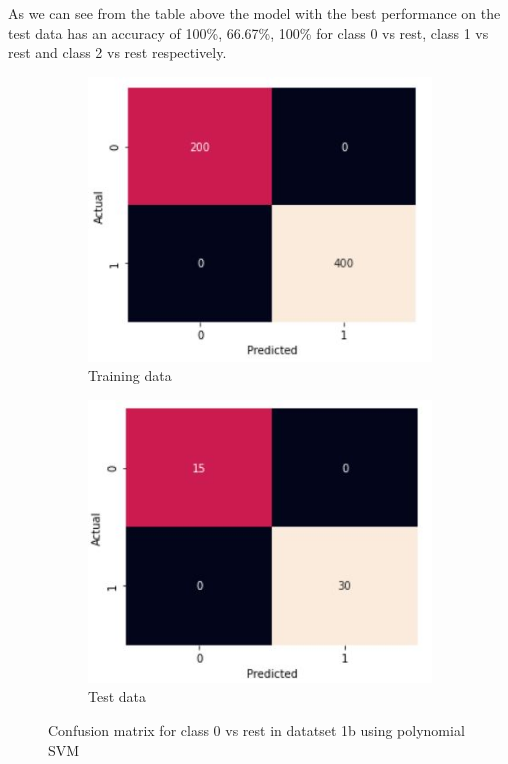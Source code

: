 \documentclass[11pt]{article}
\begin{document}
As we can see from the table above the model with the best performance on the test data has an accuracy of 100\%, 66.67\%, 100\% for class 0 vs rest, class 1 vs rest and class 2 vs rest respectively. 

\begin{figure}[h]
\centering
	\begin{subfigure}[b]{0.45\textwidth}
	\centering
	\includegraphics[scale=0.5]{dataset1b_poly_svm_0_cm_train.jpg}
	\caption{Training data}
	\label{fig:fig2.2.1.1}
	\end{subfigure}
	\begin{subfigure}[b]{0.45\textwidth}
	\centering
	\includegraphics[scale=0.5]{dataset1b_poly_svm_0_cm_test.jpg}
	\caption{Test data}
	\label{fig:fig2.2.1.2}
	\end{subfigure}
\caption{Confusion matrix for class 0 vs rest in datatset 1b using polynomial SVM}
\label{fig:fig2.2.1}
\end{figure}
\end{document}
